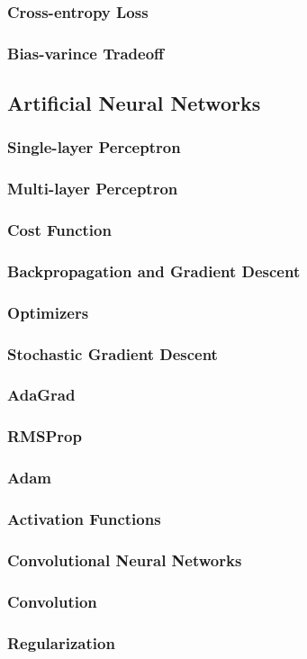 \subsubsection{Cross-entropy Loss}
\subsubsection{Bias-varince Tradeoff}

\subsection{Artificial Neural Networks} %
\subsubsection{Single-layer Perceptron} %
\subsubsection{Multi-layer Perceptron} %
\subsubsection{Cost Function}
\subsubsection{Backpropagation and Gradient Descent}
\subsubsection{Optimizers}
\subsubsection{Stochastic Gradient Descent}
\subsubsection{AdaGrad}
\subsubsection{RMSProp}
\subsubsection{Adam}
\subsubsection{Activation Functions}
\subsubsection{Convolutional Neural Networks}
\subsubsection{Convolution}
\subsubsection{Regularization}